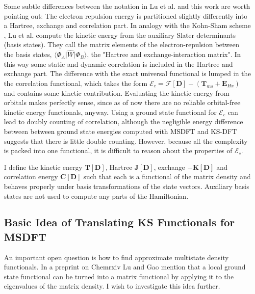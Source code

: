 \documentclass[journal=jpclcd,manuscript=letter]{achemso}
\newcommand\m[1]{\mathbf{#1}}
\begin{document}
Some subtle differences between the notation in Lu et al. \cite{Lu2022JPCL,Lu2022JCTC} and this work are worth pointing out:
The electron repulsion energy is partitioned slightly differently into a Hartree, exchange and correlation part.
In analogy with the Kohn-Sham scheme \cite{Kohn1965}, Lu et al. compute the kinetic energy from the auxiliary Slater determinants (basis states).
They call the matrix elements of the electron-repulsion between the basis states,
$\langle \Phi_A \vert \hat{W} \vert \Phi_B \rangle$, the "Hartree and exchange-interaction matrix".
In this way some static and dynamic correlation is included in the Hartree and exchange part.
The difference with the exact universal functional is lumped in the the correlation functional, which takes the
form $\mathcal{E}_c = \mathcal{F}[\m{D}] - (\m{T}_{ms} + \m{E}_{Hx})$ \cite[Eqn.~(22)]{Lu2022JPCL}
and contains some kinetic contribution.
Evaluating the kinetic energy from orbitals
makes perfectly sense, since as of now there are no reliable orbital-free kinetic energy functionals, anyway.
Using a ground state functional for $\mathcal{E}_c$ can lead to doubly counting of correlation,
although the negligible energy difference between between ground state energies computed with MSDFT and KS-DFT
suggests that there is little double counting. \cite{Zhu2023} However, because all the complexity is packed into one
functional, it is difficult to reason about the properties of $\mathcal{E}_c$.

I define the kinetic energy $\m{T}[\m{D}]$, Hartree $\m{J}[\m{D}]$, exchange $-\m{K}[\m{D}]$ and correlation energy
$\m{C}[\m{D}]$ such that each is a functional of the matrix density and behaves properly under basis transformations
of the state vectors.
Auxiliary basis states are not used to compute any parts of the Hamiltonian.

\subsection{Basic Idea of Translating KS Functionals for MSDFT
\label{sec:basic_ideas_Taylor_series}
}
An important open question is how to find approximate multistate density functionals. 
In a preprint on Chemrxiv \cite{lu_gao_2021_chemrxiv} Lu and Gao mention that a local ground state functional
can be turned into a matrix functional by applying it to the eigenvalues of the matrix density.
I wish to investigate this idea further.
\end{document}
